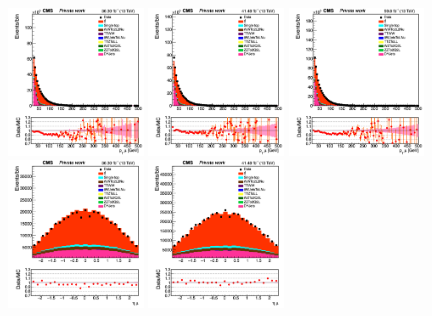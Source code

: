 \documentclass{cernatlasnote}
\begin{document}
\begin{figure}[htp]
\centering
 \includegraphics[width=0.32\textwidth]{images/emu_channel/2016/16_Range_0pt7_1pt3/leading_muon_pt_trig_Linear.png}
\includegraphics[width=0.32\textwidth]{images/emu_channel/2017/17_Range_0pt7_1pt3/leading_muon_pt_trig_Linear.png}
 \includegraphics[width=0.32\textwidth]{images/emu_channel/2018/18_Range_0pt7_1pt3/leading_muon_pt_trig_Linear.png}\\
 \includegraphics[width=0.32\textwidth]{images/emu_channel/2016/16_Range_0pt7_1pt3/leading_muon_eta_trig_Linear.png}
\includegraphics[width=0.32\textwidth]{images/emu_channel/2017/17_Range_0pt7_1pt3/leading_muon_eta_trig_Linear.png}

\end{figure}
\end{document}
